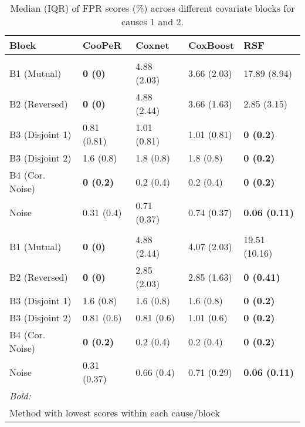 \begin{table}
\centering
\caption{Median (IQR) of FPR scores (\%) across different covariate blocks for causes 1 and 2.\label{tab:fpr-median}}
\centering
\begin{tabular}[t]{lllll}
\toprule
Block & CooPeR & Coxnet & CoxBoost & RSF\\
\midrule
\addlinespace[0.3em]
\multicolumn{5}{l}{\textbf{Cause 1}}\\
\hspace{1em}B1 (Mutual) & \textbf{0 (0)} & 4.88 (2.03) & 3.66 (2.03) & 17.89 (8.94)\\
\hspace{1em}B2 (Reversed) & \textbf{0 (0)} & 4.88 (2.44) & 3.66 (1.63) & 2.85 (3.15)\\
\hspace{1em}B3 (Disjoint 1) & 0.81 (0.81) & 1.01 (0.81) & 1.01 (0.81) & \textbf{0 (0.2)}\\
\hspace{1em}B3 (Disjoint 2) & 1.6 (0.8) & 1.8 (0.8) & 1.8 (0.8) & \textbf{0 (0.2)}\\
\hspace{1em}B4 (Cor. Noise) & \textbf{0 (0.2)} & 0.2 (0.4) & 0.2 (0.4) & \textbf{0 \vphantom{1} (0.2)}\\
\hspace{1em}Noise & 0.31 (0.4) & 0.71 (0.37) & 0.74 (0.37) & \textbf{0.06 (0.11)}\\
\addlinespace[0.3em]
\multicolumn{5}{l}{\textbf{Cause 2}}\\
\hspace{1em}B1 (Mutual) & \textbf{0 (0)} & 4.88 (2.44) & 4.07 (2.03) & 19.51 (10.16)\\
\hspace{1em}B2 (Reversed) & \textbf{0 (0)} & 2.85 (2.03) & 2.85 (1.63) & \textbf{0 (0.41)}\\
\hspace{1em}B3 (Disjoint 1) & 1.6 (0.8) & 1.6 (0.8) & 1.6 (0.8) & \textbf{0 (0.2)}\\
\hspace{1em}B3 (Disjoint 2) & 0.81 (0.6) & 0.81 (0.6) & 1.01 (0.6) & \textbf{0 (0.2)}\\
\hspace{1em}B4 (Cor. Noise) & \textbf{0 (0.2)} & 0.2 (0.4) & 0.2 (0.4) & \textbf{0 (0.2)}\\
\hspace{1em}Noise & 0.31 (0.37) & 0.66 (0.4) & 0.71 (0.29) & \textbf{0.06 (0.11)}\\
\bottomrule
\multicolumn{5}{l}{\rule{0pt}{1em}\textit{Bold:}}\\
\multicolumn{5}{l}{\rule{0pt}{1em}Method with lowest scores within each cause/block}\\
\end{tabular}
\end{table}
